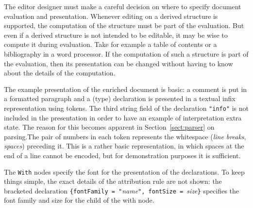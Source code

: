 The editor designer must make a careful decision on where to specify document evaluation and presentation. Whenever editing on a derived structure is supported, the computation of the structure must be part of the evaluation. But even if a derived structure is not intended to be editable, it may be wise to compute it during evaluation. Take for example a table of contents or a bibliography in a word processor. If the computation of such a structure is part of the evaluation, then its presentation can be changed without having to know about the details of the computation.

 The example presentation of the enriched document is basic: a comment is put in a formatted paragraph and a (type) declaration is presented in a textual infix representation using tokens. The third string field of the declaration \verb|"info"| is not included in the presentation in order to have an example of interpretation extra state. \bc The reason for this becomes apparent in Section~\ref{sect:parser} on parsing.\ec  The pair of numbers in each token represents the whitespace ({\em line breaks}, {\em spaces}) preceding it. This is a rather basic representation, in which spaces at the end of a line cannot be encoded, but for demonstration purposes it is sufficient.

The \verb|With| nodes specify the font for the presentation of the declarations. To keep things simple, the exact details of the attribution rule are not shown: the bracketed declaration \verb|{fontFamily = "|{\em name}\verb|", fontSize = |{\em size}\verb|}| specifies the font family and size for the child of the with node.

